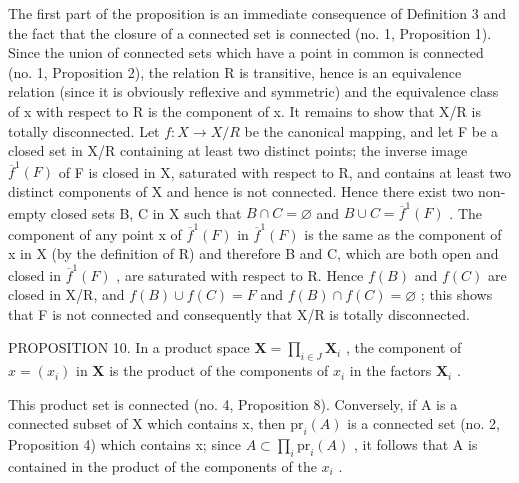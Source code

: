 The first part of the proposition is an immediate consequence of Definition 3 and the fact that the closure of a connected set is connected (no. 1, Proposition 1). Since the union of connected sets which have a point in common is connected (no. 1, Proposition 2), the relation R is transitive, hence is an equivalence relation (since it is obviously reflexive and symmetric) and the equivalence class of x with respect to R is the component of x. It remains to show that X/R is totally disconnected. Let \(f: X \to X/R\) be the canonical mapping, and let F be a closed set in X/R containing at least two distinct points; the inverse image \(\overline{f}^{1}(F)\) of F is closed in X, saturated with respect to R, and contains at least two distinct components of X and hence is not connected. Hence there exist two non-empty closed sets B, C in X such that \(B \cap C = \varnothing\) and \(B \cup C = \overline{f}^{1}(F)\) . The component of any point x of \(\overline{f}^{1}(F)\) in \(\overline{f}^{1}(F)\) is the same as the component of x in X (by the definition of R) and therefore B and C, which are both open and closed in \(\overline{f}^{1}(F)\) , are saturated with respect to R. Hence \(f(B)\) and \(f(C)\) are closed in X/R, and \(f(B) \cup f(C) = F\) and \(f(B) \cap f(C) = \varnothing\) ; this shows that F is not connected and consequently that X/R is totally disconnected.

PROPOSITION 10. In a product space \(\mathbf{X} = \prod_{i\in J}\mathbf{X}_i\) , the component of \(x = (x_i)\) in \(\mathbf{X}\) is the product of the components of \(x_i\) in the factors \(\mathbf{X}_i\) .

This product set is connected (no. 4, Proposition 8). Conversely, if A is a connected subset of X which contains x, then \(\mathrm{pr}_{i}(A)\) is a connected set (no. 2, Proposition 4) which contains x; since \(A \subset \prod_{i} \mathrm{pr}_{i}(A)\) , it follows that A is contained in the product of the components of the \(x_{i}\) .

